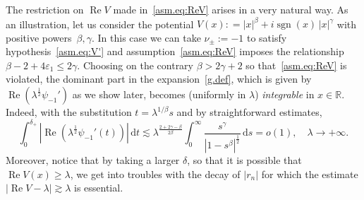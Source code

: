 \begin{Remark}
\label{rem:ReV.asm}
The restriction on ${\operatorname{Re}} V$ made in~\eqref{asm.eq:ReV}
arises in a very natural way. 
As an illustration, let us consider the potential
$V (x): = |x|^\beta + i {\mathop{\mathrm{sgn}}\nolimits} (x) \, |x|^\gamma$
with positive powers~$\beta,\gamma$.
In this case we can take $\nu_\pm:=-1$ 
to satisfy hypothesis~\eqref{asm.eq:V'}
and assumption~\eqref{asm.eq:ReV} imposes
the relationship $\beta-2+4{\varepsilon}_1 \leq 2\gamma$.
Choosing on the contrary $\beta > 2\gamma +2$
so that~\eqref{asm.eq:ReV} is violated,
the dominant part in the expansion~\eqref{g.def}, 
which is given by~${\operatorname{Re}} \left( \lambda^{\frac 12} \psi_{-1}' \right)$ 
as we show later, becomes (uniformly in $\lambda$) 
\emph{integrable} in $x\in {\mathbb{R}}$. 
Indeed, with the substitution 
$t = \lambda^{1/\beta}s$ and by  straightforward estimates,
\begin{equation}\label{ReV.ex}
\int_0^{\delta_+} 
\left|{\operatorname{Re}} \left( \lambda^{\frac 12} \psi_{-1}'(t) \right)\right| \, {\mathrm{d}} t
{\lesssim} 
\lambda^{\frac{2+2\gamma - \beta}{2\beta}}
\int_0^\infty
\frac{s^\gamma}{|1-s^\beta|^\frac 12} \, {\mathrm{d}} s 
= o(1), \quad \lambda \to +\infty.
\end{equation}
Moreover, notice that by taking a larger $\delta$, so that it is possible that ${\operatorname{Re}} V(x) \geq \lambda$,  we get into troubles with the decay of $|r_n|$ for which the estimate $|{\operatorname{Re}} V - \lambda| {\gtrsim} \lambda$ is essential.	
\end{Remark}

